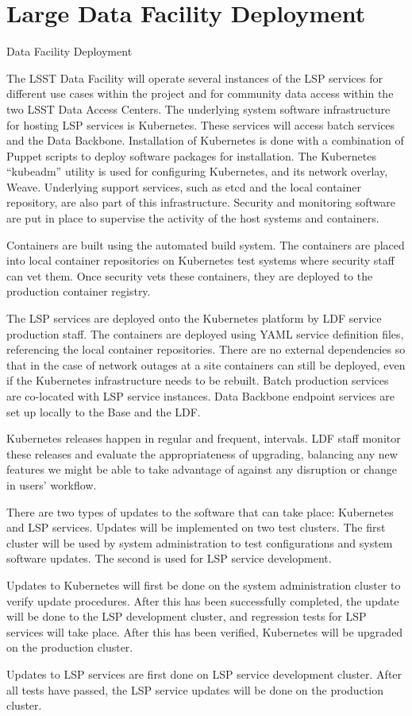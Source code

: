 \section{Large Data Facility Deployment}\label{large-data-facility-deployment}

Data Facility Deployment

The LSST Data Facility will operate several instances of the LSP services for different use cases within the project and for community data access within the two LSST Data Access Centers. The underlying system software infrastructure for hosting LSP services is Kubernetes.  These services will access batch services and the Data Backbone. Installation of Kubernetes is done with a combination of Puppet scripts to deploy software packages for installation. The Kubernetes “kubeadm” utility is used for configuring Kubernetes, and its network overlay, Weave.  Underlying support services, such as etcd and the local container repository, are also part of this infrastructure.  Security and monitoring software are put in place to supervise the activity of the host systems and containers.

Containers are built using the automated build system.  The containers are placed into local container repositories on Kubernetes test systems where security staff can vet them.  Once security vets these containers, they are deployed to the production container registry.

The LSP services are deployed onto the Kubernetes platform by LDF service production staff.  The containers are deployed using YAML service definition files, referencing the local container repositories.   There are no external dependencies so that in the case of network outages at a site containers can still be deployed, even if the Kubernetes infrastructure needs to be rebuilt. Batch production services are co-located with LSP service instances. Data Backbone endpoint services are set up locally to the Base and the LDF.

Kubernetes releases happen in regular and frequent, intervals.  LDF staff monitor these releases and evaluate the appropriateness of upgrading, balancing any new features we might be able to take advantage of against any disruption or change in users’ workflow. 

There are two types of updates to the software that can take place:  Kubernetes and LSP services.  Updates will be implemented on two test clusters.   The first cluster will be used by system administration to test configurations and system software updates.  The second is used for LSP service development.     

Updates to Kubernetes will first be done on the system administration cluster to verify update procedures. After this has been successfully completed, the update will be done to the LSP development cluster, and regression tests for LSP services will take place.  After this has been verified,  Kubernetes will be upgraded on the production cluster.
 
Updates to LSP services are first done on LSP service development cluster. After all tests have passed, the LSP service updates will be done on the production cluster.

